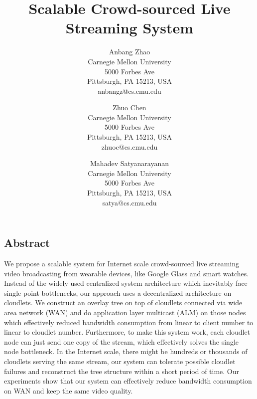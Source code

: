 \documentclass[letterpaper,twocolumn,10pt]{article}
\begin{document}
\date{}

\title{\Large \bf Scalable Crowd-sourced Live Streaming System}

\author{
{\rm Anbang Zhao}\\
Carnegie Mellon University\\
5000 Forbes Ave\\
Pittsburgh, PA 15213, USA\\
anbangz@cs.cmu.edu
\and
{\rm Zhuo Chen}\\
Carnegie Mellon University\\
5000 Forbes Ave\\
Pittsburgh, PA 15213, USA\\
zhuoc@cs.cmu.edu
\and
{\rm Mahadev Satyanarayanan}\\
Carnegie Mellon University\\
5000 Forbes Ave\\
Pittsburgh, PA 15213, USA\\
satya@cs.cmu.edu
} %

\maketitle

\thispagestyle{empty}


\subsection*{Abstract}

We propose a scalable system for Internet scale crowd-sourced live streaming video broadcasting from wearable devices, like Google Glass and smart watches. Instead of the widely used centralized system architecture which inevitably face single point bottlenecks, our approach uses a decentralized architecture on cloudlets. We construct an overlay tree on top of cloudlets connected via wide area network (WAN) and do application layer multicast (ALM) on those nodes which effectively reduced bandwidth consumption from linear to client number to linear to cloudlet number. Furthermore, to make this system work, each cloudlet node can just send one copy of the stream, which effectively solves the single node bottleneck. In the Internet scale, there might be hundreds or thousands of cloudlets serving the same stream, our system can tolerate possible cloudlet failures and reconstruct the tree structure within a short period of time. Our experiments show that our system can effectively reduce bandwidth consumption on WAN and keep the same video quality.
\end{document}
